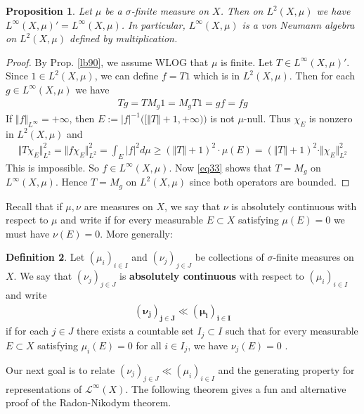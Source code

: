 \documentclass[12pt,b5paper,notitlepage]{article}
\theoremstyle{definition}
\newtheorem{df}{Definition}[section]
\theoremstyle{plain}
\newtheorem{pp}[df]{Proposition}
\newcommand{\mc}{\mathcal}
\numberwithin{equation}{section}
\begin{document}
\begin{pp}\label{lb93}
Let $\mu$ be a $\sigma$-finite measure on $X$. Then on $L^2(X,\mu)$ we have $L^\infty(X,\mu)'=L^\infty(X,\mu)$. In particular, $L^\infty(X,\mu)$ is a von Neumann algebra on $L^2(X,\mu)$ defined by multiplication.
\end{pp}



\begin{proof}
By Prop. \ref{lb90}, we assume WLOG that $\mu$ is finite. Let $T\in L^\infty(X,\mu)'$. Since $1\in L^2(X,\mu)$, we can define $f=T1$ which is in $L^2(X,\mu)$. Then for each $g\in L^\infty(X,\mu)$ we have
\begin{align*}
Tg=TM_g1=M_gT1=gf=fg \tag{$\star$}\label{eq33}
\end{align*}
If $\Vert f\Vert_{L^\infty}=+\infty$, then $E:=|f|^{-1}\big([\Vert T\Vert+1,+\infty)\big)$ is not $\mu$-null. Thus $\chi_E$ is nonzero in $L^2(X,\mu)$ and
\begin{align*}
\Vert T\chi_E\Vert_{L^2}^2=\Vert f\chi_E\Vert_{L^2}^2=\int_E|f|^2d\mu\geq (\Vert T\Vert+1)^2\cdot\mu(E)=(\Vert T\Vert+1)^2\cdot\Vert \chi_E\Vert^2_{L^2}
\end{align*}
This is impossible. So $f\in L^\infty(X,\mu)$. Now \eqref{eq33} shows that $T=M_g$ on $L^\infty(X,\mu)$. Hence $T=M_g$ on $L^2(X,\mu)$ since both operators are bounded.
\end{proof}


Recall that if $\mu,\nu$ are measures on $X$, we say that $\nu$ is absolutely continuous with respect to $\mu$ and write \pmb{$\nu\ll\mu$} if for every measurable $E\subset X$ satisfying $\mu(E)=0$ we must have $\nu(E)=0$. More generally:

\begin{df}
Let $(\mu_i)_{i\in I}$ and $(\nu_j)_{j\in J}$ be collections of $\sigma$-finite measures on $X$. We say that $(\nu_j)_{j\in J}$ is \textbf{absolutely continuous} with respect to $(\mu_i)_{i\in I}$ and write
\begin{align*}
\pmb{(\nu_j)_{j\in J}\ll (\mu_i)_{i\in I}}
\end{align*}
if for each $j\in J$ there exists a countable set $I_j\subset I$ such that for every measurable $E\subset X$ satisfying $\mu_i(E)=0$ for all $i\in I_j$, we have $\nu_j(E)=0$ .
\end{df}



Our next goal is to relate $(\nu_j)_{j\in J}\ll (\mu_i)_{i\in I}$ and the generating property for representations of $\mc L^\infty(X)$. The following theorem gives a fun and alternative proof of the Radon-Nikodym theorem.
\end{document}
